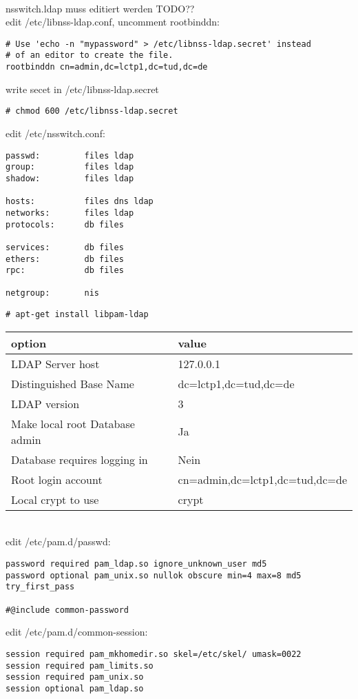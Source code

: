 \\
nsswitch.ldap muss editiert werden TODO??\\
edit /etc/libnss-ldap.conf, uncomment rootbinddn:
\begin{lstlisting}[style=Bash]
# Use 'echo -n "mypassword" > /etc/libnss-ldap.secret' instead
# of an editor to create the file.
rootbinddn cn=admin,dc=lctp1,dc=tud,dc=de
\end{lstlisting}
write secet in /etc/libnss-ldap.secret
\begin{lstlisting}[style=Bash]
# chmod 600 /etc/libnss-ldap.secret 
\end{lstlisting}
edit /etc/nsswitch.conf:
\begin{lstlisting}[style=Bash]
passwd:         files ldap
group:          files ldap
shadow:         files ldap

hosts:          files dns ldap
networks:       files ldap
protocols:      db files

services:       db files
ethers:         db files
rpc:            db files

netgroup:       nis
\end{lstlisting}
\begin{lstlisting}[style=Bash]
# apt-get install libpam-ldap
\end{lstlisting}
\begin{tabular}{ l | l }
 option & value\\
 \hline
 LDAP Server host & 127.0.0.1\\
 Distinguished Base Name & dc=lctp1,dc=tud,dc=de\\
 LDAP version & 3\\
 Make local root Database admin & Ja\\
 Database requires logging in & Nein\\
 Root login account & cn=admin,dc=lctp1,dc=tud,dc=de\\
 Local crypt to use & crypt\\
\end{tabular}
\\
edit /etc/pam.d/passwd:
\begin{lstlisting}[style=Bash]
password required pam_ldap.so ignore_unknown_user md5
password optional pam_unix.so nullok obscure min=4 max=8 md5 try_first_pass

#@include common-password
\end{lstlisting}
edit /etc/pam.d/common-session:
\begin{lstlisting}[style=Bash]
session required pam_mkhomedir.so skel=/etc/skel/ umask=0022
session required pam_limits.so
session required pam_unix.so
session optional pam_ldap.so
\end{lstlisting}


